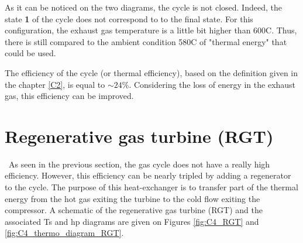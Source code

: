 As it can be noticed on the two diagrams, the cycle is not closed. Indeed, the state \textbf{1} of the cycle does not correspond to to the final state. For this configuration, the exhaust gas temperature is a little bit higher than 600\degree C. Thus, there is still compared to the ambient condition 580\degree C of "thermal energy" that could be used.

The efficiency of the cycle (or thermal efficiency), based on the definition given in the chapter \ref{C2}, is equal to $\sim 24$\%. Considering the loss of energy in the exhaust gas, this efficiency can be improved.

\section{Regenerative gas turbine (RGT)}
\quad\, As seen in the previous section, the gas cycle does not have a really high efficiency. However, this efficiency can be nearly tripled by adding a regenerator to the cycle. The purpose of this heat-exchanger is to transfer part of the thermal energy from the hot gas exiting the turbine to the cold flow exiting the compressor. A schematic of the regenerative gas turbine (RGT) and the associated Ts and hp diagrams are given on Figures \ref{fig:C4_RGT} and \ref{fig:C4_thermo_diagram_RGT}. 

